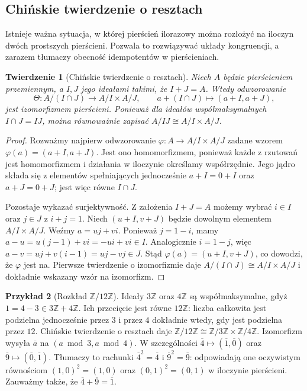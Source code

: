 \documentclass[11pt,a4paper,openany]{report}
\numberwithin{equation}{section}
\theoremstyle{plain}
\newtheorem{twierdzenie}{Twierdzenie}[section]
\theoremstyle{definition}
\newtheorem{przyklad}[twierdzenie]{Przykład}
\theoremstyle{remark}
\newcommand{\Z}{\mathbb Z}
\begin{document}
\subsection{Chińskie twierdzenie o resztach}

Istnieje ważna sytuacja, w której pierścień ilorazowy można rozłożyć
na iloczyn dwóch prostszych pierścieni. Pozwala to rozwiązywać układy
kongruencji, a zarazem tłumaczy obecność idempotentów w pierścieniach.

\begin{twierdzenie}[Chińskie twierdzenie o resztach]
\label{tw:crt}
Niech $A$ będzie pierścieniem przemiennym, a $I,J$ jego ideałami
takimi, że $I+J=A$. Wtedy odwzorowanie
\[
 \Theta\colon A/(I\cap J)\longrightarrow A/I\times A/J,\qquad
 a+(I\cap J)\longmapsto(a+I,a+J),
\]
jest izomorfizmem pierścieni. Ponieważ dla ideałów współmaksymalnych
$I\cap J=IJ$, można równoważnie zapisać $A/IJ\cong A/I\times A/J$.
\end{twierdzenie}
\begin{proof}
Rozważmy najpierw odwzorowanie
$\varphi\colon A\to A/I\times A/J$ zadane wzorem
$\varphi(a)=(a+I,a+J)$. Jest ono homomorfizmem, ponieważ każde
z rzutowań jest homomorfizmem i działania w iloczynie określamy
współrzędnie. Jego jądro składa się z elementów spełniających
jednocześnie $a+I=0+I$ oraz $a+J=0+J$; jest więc równe $I\cap J$.

Pozostaje wykazać surjektywność. Z założenia $I+J=A$ możemy wybrać
$i\in I$ oraz $j\in J$ z $i+j=1$.
Niech $(u+I,v+J)$ będzie dowolnym elementem $A/I\times A/J$.
Weźmy $a=uj+vi$. Ponieważ $j=1-i$, mamy
$a-u=u(j-1)+vi=-ui+vi\in I$.
Analogicznie $i=1-j$, więc
$a-v=uj+v(i-1)=uj-vj\in J$.
Stąd $\varphi(a)=(u+I,v+J)$, co dowodzi, że $\varphi$ jest na.
Pierwsze twierdzenie o izomorfizmie daje
$A/(I\cap J)\cong A/I\times A/J$ i dokładnie wskazany wzór na izomorfizm.
\end{proof}

\begin{przyklad}[Rozkład $\Z/12\Z$]
Ideały $3\Z$ oraz $4\Z$ są współmaksymalne, gdyż
$1=4-3\in3\Z+4\Z$. Ich przecięcie jest równe $12\Z$:
liczba całkowita jest podzielna jednocześnie przez $3$ i przez $4$
dokładnie wtedy, gdy jest podzielna przez $12$.
Chińskie twierdzenie o resztach daje
$\Z/12\Z\cong\Z/3\Z\times\Z/4\Z$.
Izomorfizm wysyła $\overline a$ na
$(a\bmod 3,a\bmod 4)$.
W szczególności $\overline4\mapsto(\overline1,\overline0)$
oraz $\overline9\mapsto(\overline0,\overline1)$.
Tłumaczy to rachunki $\overline4^2=\overline4$ i
$\overline9^2=\overline9$: odpowiadają one oczywistym równościom
$(1,0)^2=(1,0)$ oraz $(0,1)^2=(0,1)$ w iloczynie pierścieni.
Zauważmy także, że $\overline4+\overline9=\overline1$.
\end{przyklad}
\end{document}
